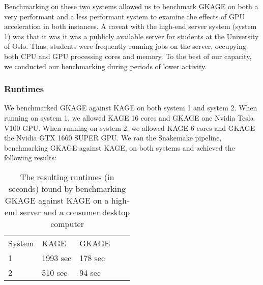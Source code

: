 Benchmarking on these two systems allowed us to benchmark GKAGE on both a very performant and a less performant system to examine the effects of GPU acceleration in both instances.
A caveat with the high-end server system (system 1) was that it was it was a publicly available server for students at the University of Oslo.
Thus, students were frequently running jobs on the server, occupying both CPU and GPU processing cores and memory.
To the best of our capacity, we conducted our benchmarking during periods of lower activity.

\subsubsection{Runtimes}
We benchmarked GKAGE against KAGE on both system 1 and system 2.
When running on system 1, we allowed KAGE 16 cores and GKAGE one Nvidia Tesla V100 GPU.
When running on system 2, we allowed KAGE 6 cores and GKAGE the Nvidia GTX 1660 SUPER GPU.
We ran the Snakemake pipeline, benchmarking GKAGE against KAGE, on both systems and achieved the following results:

\begin{table}[H]
\begin{center}
\begin{tabular}{lllll}
\multicolumn{1}{l|}{System} & \multicolumn{1}{l}{KAGE}     & \multicolumn{1}{l}{GKAGE} &  \\ \cline{1-3}
\multicolumn{1}{l|}{1}      & \multicolumn{1}{l}{1993 sec} & \multicolumn{1}{l}{178 sec} &  \\
\multicolumn{1}{l|}{2}      & \multicolumn{1}{l}{510 sec}  & \multicolumn{1}{l}{94 sec} &  \\
\end{tabular}
\end{center}
\caption{
  The resulting runtimes (in seconds) found by benchmarking GKAGE against KAGE on a high-end server and a consumer desktop computer
}
\label{results:benchmarking:tables:runtimes}
\end{table}

